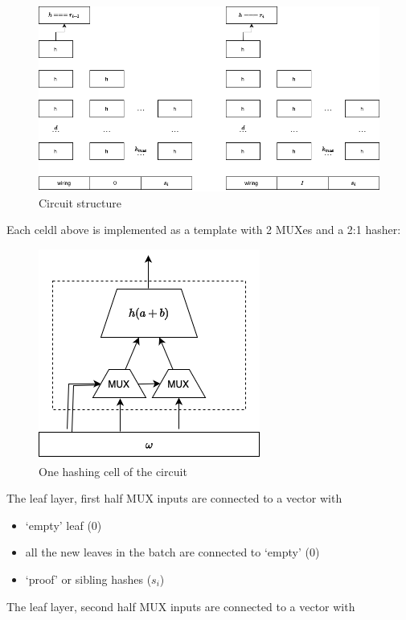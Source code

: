 \documentclass{llncs}
\begin{document}
\begin{figure}[!htbp]
        \begin{center}
                \includegraphics[width=0.9 \textwidth]{pic/smt-circuit.drawio}
                \caption{Circuit structure}\label{fi:smt-circuit}
        \end{center}
\end{figure}

Each celdl above is implemented as a template with 2 MUXes and a 2:1 hasher:

\begin{figure}[!htbp]
        \begin{center}
                \includegraphics[width=.3 \textwidth]{pic/smt-circuit-cell.drawio}
                \caption{One hashing cell of the circuit}\label{fi:smt-circuit-cell}
        \end{center}
\end{figure}


The leaf layer, first half MUX inputs are connected to a vector with

\begin{itemize}
    \item `empty' leaf ($0$)
    \item all the new leaves in the batch are connected to `empty' ($0$)
    \item `proof' or sibling hashes ($s_i$)
\end{itemize}

The leaf layer, second half MUX inputs are connected to a vector with
\end{document}
